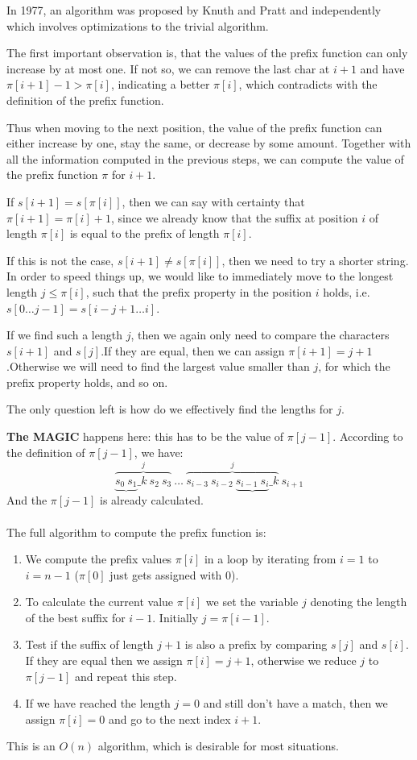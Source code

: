 \documentclass[cn,black,12pt,normal]{elegantnote}
\newcommand{\uct}[1]{\textsuperscript{\textsuperscript{\cite{#1}}}}
\begin{document}
In 1977, an algorithm was proposed by Knuth and Pratt and independently which involves optimizations to the trivial algorithm.

The first important observation is, that the values of the prefix function can only increase by at most one. If not so, we can remove the last char at $i+1$ and have $\pi[i + 1] - 1 > \pi[i]$, indicating a better $\pi[i]$, which contradicts with the definition of the prefix function.

Thus when moving to the next position, the value of the prefix function can either increase by one, stay the same, or decrease by some amount. Together with all the information computed in the previous steps, we can compute the value of the prefix function $\pi$ for $i + 1$.

If $s[i+1] = s[\pi[i]]$, then we can say with certainty that $\pi[i+1] = \pi[i] + 1$, since we already know that the suffix at position $i$ of length $\pi[i]$ is equal to the prefix of length $\pi[i]$.

If this is not the case, $s[i+1] \neq s[\pi[i]]$, then we need to try a shorter string.
In order to speed things up, we would like to immediately move to the longest length $j \le \pi[i]$, such that the prefix property in the position $i$ holds, i.e. $s[0 \dots j-1] = s[i-j+1 \dots i]$.

If we find such a length $j$, then we again only need to compare the characters $s[i+1]$ and $s[j]$.If they are equal, then we can assign $\pi[i+1] = j + 1$.Otherwise we will need to find the largest value smaller than $j$, for which the prefix property holds, and so on.

The only question left is how do we effectively find the lengths for $j$.

\textbf{The MAGIC} happens here: this has to be the value of $\pi[j-1]$. According to the definition of $\pi[j-1]$, we have:
$$\overbrace{\underbrace{s_0 ~ s_1}\_k ~ s_2 ~ s_3}^j ~ \dots ~ \overbrace{s_{i-3} ~ s_{i-2} ~ \underbrace{s_{i-1} ~ s_{i}}\_k}^j ~s_{i+1}$$
And the $\pi[j-1]$ is already calculated.

The full algorithm to compute the prefix function is\uct{github:prefix}:
\begin{enumerate}
    \item We compute the prefix values $\pi[i]$ in a loop by iterating from $i = 1$ to $i = n-1$ ($\pi[0]$ just gets assigned with $0$).
    \item To calculate the current value $\pi[i]$ we set the variable $j$ denoting the length of the best suffix for $i-1$. Initially $j = \pi[i-1]$.
    \item Test if the suffix of length $j+1$ is also a prefix by comparing $s[j]$ and $s[i]$. If they are equal then we assign $\pi[i] = j + 1$, otherwise we reduce $j$ to $\pi[j-1]$ and repeat this step.
    \item If we have reached the length $j = 0$ and still don't have a match, then we assign $\pi[i] = 0$ and go to the next index $i + 1$.
\end{enumerate}
This is an $O(n)$ algorithm, which is desirable for most situations.
\end{document}
